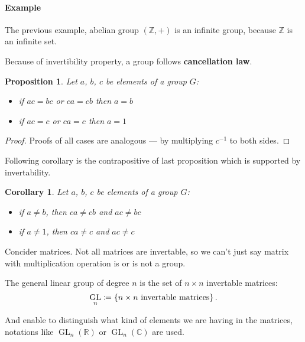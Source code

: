 \documentclass[UTF8]{ctexart}
\theoremstyle{mystyle}
\newtheorem{proposition}{Proposition}[section]
\theoremstyle{myremark}
\theoremstyle{plain}
\newtheorem{corollary}{Corollary}[section]
\newcommand{\R}{\mathbb R}
\newcommand{\Z}{\mathbb Z}
\newcommand{\C}{\mathbb C}
\DeclareMathOperator{\GL}{GL}
\DeclarePairedDelimiter\set{\{}{\}}
\begin{document}
\paragraph{Example}
The previous example, abelian group $ (\Z, +) $ is an infinite group, because $ \Z $ is an infinite set.

Because of invertibility property, a group follows \textbf{cancellation law}.

\begin{proposition}{}
    Let $ a $, $ b $, $ c $ be elements of a group $ G $: 
    \begin{itemize}
        \item if $ ac = bc $ or $ ca = cb $ then $ a = b $
        \item if $ ac = c $ or $ ca = c $ then $ a = 1 $
    \end{itemize}
\end{proposition}

\begin{proof}
    Proofs of all cases are analogous --- by multiplying $ c^{-1} $ to both sides.
\end{proof}

Following corollary is the contrapositive of last proposition which is supported by invertability.

\begin{corollary}
    Let $ a $, $ b $, $ c $ be elements of a group $ G $: 
    \begin{itemize}
        \item if $ a \neq b $, then $ ca \neq cb $ and $ ac \neq bc $
        \item if $ a \neq 1 $, then $ ca \neq c $ and $ ac \neq c $
    \end{itemize}
\end{corollary}

Concider matrices. Not all matrices are invertable, so we can't just say matrix with multiplication operation is or is not a group.

\begin{definition}
    The general linear group of degree $ n $ is the set of $ n \times n $ invertable matrices:
    \[ \GL_n \coloneqq \set{n \times n \text{ invertable matrices}} \,.\]

    And enable to distinguish what kind of elements we are having in the matrices, notations like $ \GL_n(\R) $ or $ \GL_n(\C) $ are used.
\end{definition}
\end{document}
